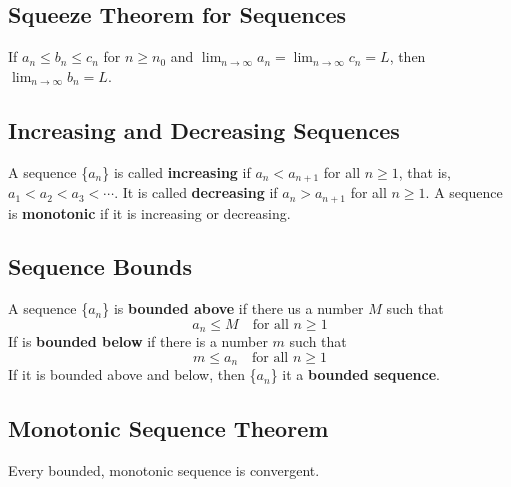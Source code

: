 \subsection*{Squeeze Theorem for Sequences}

If \(a_n \leq b_n \leq c_n\) for \(n \geq n_0\) and \( \lim_{n \to \infty}{a_n} = \lim_{n \to \infty}{c_n} = L\), then \( \lim_{n \to \infty}{b_n} = L\).

\subsection*{Increasing and Decreasing Sequences}

A sequence \{\(a_n\)\} is called \textbf{increasing} if \(a_n < a_{n+1}\) for all \(n \geq 1\), that is, \(a_1 < a_2 < a_3 < \cdots\). It is called \textbf{decreasing} if \(a_n > a_{n+1}\) for all \(n \geq 1\). A sequence is \textbf{monotonic} if it is increasing or decreasing.

\subsection*{Sequence Bounds}

A sequence \{\(a_n\)\} is \textbf{bounded above} if there us a number \(M\) such that
\[ a_n \leq M \quad \text{for all } n \geq 1 \]
If is \textbf{bounded below} if there is a number \(m\) such that
\[ m \leq a_n \quad \text{for all } n \geq 1 \]
If it is bounded above and below, then \{\(a_n\)\} it a \textbf{bounded sequence}.

\subsection*{Monotonic Sequence Theorem}

Every bounded, monotonic sequence is convergent.
